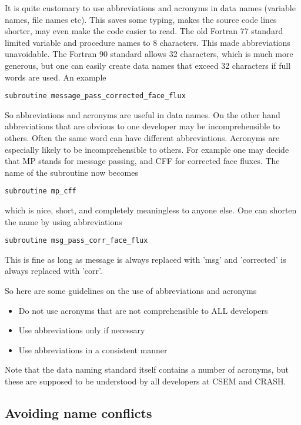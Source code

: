 \documentclass{article}
\begin{document}
It is quite customary to use abbreviations and acronyms
in data names (variable names, file names etc). 
This saves some typing, makes the source code 
lines shorter, may even make the code easier to read.
The old Fortran 77 standard limited variable and
procedure names to 8 characters. This made abbreviations unavoidable.
The Fortran 90 standard allows 32 characters, which is much more generous, 
but one can easily create data names that exceed 32 characters if full 
words are used. An example
\begin{verbatim}
subroutine message_pass_corrected_face_flux
\end{verbatim}
So abbreviations and acronyms are useful in data names.
On the other hand abbreviations that are obvious
to one developer may be incomprehensible to others. Often the same
word can have different abbreviations. Acronyms are especially 
likely to be incomprehensible to others. For example one may
decide that MP stands for message passing, and CFF for corrected
face fluxes. The name of the subroutine now becomes
\begin{verbatim}
subroutine mp_cff
\end{verbatim}
which is nice, short, and completely meaningless to anyone else.
One can shorten the name by using abbreviations
\begin{verbatim}
subroutine msg_pass_corr_face_flux
\end{verbatim}
This is fine as long as message is always replaced with 'msg' and 
'corrected' is always replaced with 'corr'.

So here are some guidelines on the use of abbreviations and acronyms
\begin{itemize}
\item Do not use acronyms that are not comprehensible to ALL developers
\item Use abbreviations only if necessary
\item Use abbreviations in a consistent manner
\end{itemize}
Note that the data naming standard itself contains a number of acronyms,
but these are supposed to be understood by all developers at CSEM and CRASH.

\subsection{Avoiding name conflicts}
\end{document}
